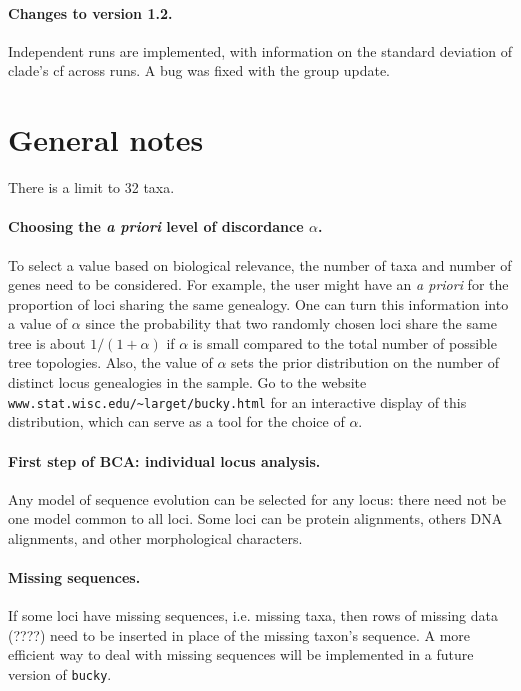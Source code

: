 \documentclass[12pt,english,final,letterpaper]{article}
\begin{document}
\paragraph{Changes to version 1.2.}
Independent runs are implemented, with information on the standard deviation
of clade's {\sc cf} across runs. A bug was fixed with the group update.


\section{General notes}

There is a limit to 32 taxa.

\paragraph{Choosing the {\it a priori} level of discordance $\alpha$.}
To select a value based on biological relevance, the number of taxa and 
number of genes need to be considered. For example, the user might have an 
{\it a priori} for the proportion of loci sharing the same genealogy. One 
can turn this information into a value of $\alpha$ since the probability that 
two randomly chosen loci share the same tree is about $1/(1+\alpha)$ if 
$\alpha$ is small compared to the total number of possible tree topologies. 
Also, the value of $\alpha$ sets the prior distribution on the number of 
distinct locus genealogies in the sample. 
Go to the website \verb+www.stat.wisc.edu/~larget/bucky.html+ 
for an interactive display of this distribution, which can
serve as a tool for the choice of $\alpha$. 

\paragraph{First step of BCA: individual locus analysis.}
Any model of sequence evolution can be selected for any locus: there need 
not be one model common to all loci. Some loci can be protein alignments,
others DNA alignments, and other morphological characters.

\paragraph{Missing sequences.}
If some loci have missing sequences, i.e. missing taxa, then
rows of missing data (????) need to be inserted in place of the missing 
taxon's sequence. A more efficient way to deal with missing 
sequences will be implemented in a future version of {\tt bucky}.
\end{document}
